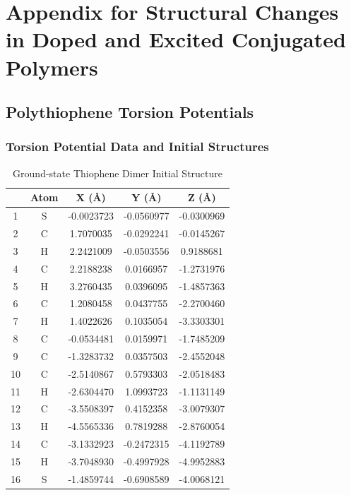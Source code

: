 %
\chapter{Appendix for Structural Changes in Doped and Excited Conjugated Polymers}\label{append:tor_model}

\section{Polythiophene Torsion Potentials}
\label{sec:pt_tp}
\subsection{Torsion Potential Data and Initial Structures}
\begin{table}[hbt!]\centering
\caption{Ground-state Thiophene Dimer Initial Structure}
\renewcommand{\arraystretch}{1.5}
\begin{threeparttable}
\begin{tabular}{ccccc}\toprule
{} & {Atom} & {X (\AA)} & {Y (\AA)} & {Z (\AA)} \\ \midrule
  1 & S & -0.0023723 & -0.0560977 & -0.0300969\\
  2 & C & 1.7070035 & -0.0292241 & -0.0145267\\
  3 & H & 2.2421009 & -0.0503556 & 0.9188681\\
  4 & C & 2.2188238 & 0.0166957 & -1.2731976\\ \midrule
  5 & H & 3.2760435 & 0.0396095 & -1.4857363\\
  6 & C & 1.2080458 & 0.0437755 & -2.2700460\\
  7 & H & 1.4022626 & 0.1035054 & -3.3303301\\
  8 & C & -0.0534481 & 0.0159971 & -1.7485209\\ \midrule
  9 & C & -1.3283732 & 0.0357503 & -2.4552048\\
  10 & C & -2.5140867 & 0.5793303 & -2.0518483\\
  11 & H & -2.6304470 & 1.0993723 & -1.1131149\\
  12 & C & -3.5508397 & 0.4152358 & -3.0079307\\ \midrule
  13 & H & -4.5565336 & 0.7819288 & -2.8760054\\
  14 & C & -3.1332923 & -0.2472315 & -4.1192789\\
  15 & H & -3.7048930 & -0.4997928 & -4.9952883\\
  16 & S & -1.4859744 & -0.6908589 & -4.0068121\\ \bottomrule
\end{tabular}
\begin{tablenotes}
\item
\end{tablenotes}
\end{threeparttable}
\end{table}

